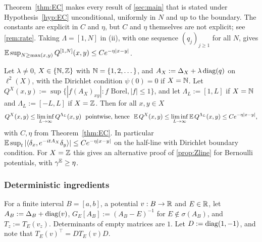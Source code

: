 Theorem~\ref{thm:EC} makes every result of \cref{sec:main} that is stated under
Hypothesis~\ref{hyp:EC} unconditional, uniformly in $N$ and up to the boundary.  The constants are
explicit in $C$ and $\eta$, but $C$ and $\eta$ themselves are not explicit; see \cref{rem:rate}.  Taking
$\Lambda=[1,N]$ in (ii), with one sequence $(q_j)_{j\ge1}$ for all $N$, gives
$\mathbb{E}\sup_{N\ge\max(x,y)}Q^{[1,N]}(x,y)\le Ce^{-\eta|x-y|}$.

\begin{corollary}\label{cor:ECinfvol}
Let $\lambda\neq0$, $X\in\{\mathbb{N},\mathbb{Z}\}$ with $\mathbb{N}=\{1,2,\dots\}$, and $A_X:=\Delta_X+\lambda\operatorname{diag}(q)$ on
$\ell^2(X)$, with the Dirichlet condition $\psi(0)=0$ if $X=\mathbb{N}$.  Let
$Q^X(x,y):=\sup\{|f(A_X)_{xy}|:f\text{ Borel},|f|\le1\}$, and let $\Lambda_L:=[1,L]$ if $X=\mathbb{N}$ and
$\Lambda_L:=[-L,L]$ if $X=\mathbb{Z}$.  Then for all $x,y\in X$
\begin{equation}\label{eq:ECinf}
  Q^X(x,y)\le\liminf_{L\to\infty}Q^{\Lambda_L}(x,y)\ \ \text{pointwise, hence}\ \
  \mathbb{E}\,Q^X(x,y)\le\liminf_{L\to\infty}\mathbb{E}\,Q^{\Lambda_L}(x,y)\le Ce^{-\eta|x-y|},
\end{equation}
with $C,\eta$ from Theorem~\ref{thm:EC}.  In particular
$\mathbb{E}\sup_t|\langle\delta_x,e^{-itA_X}\delta_y\rangle|\le Ce^{-\eta|x-y|}$ on the half-line with Dirichlet
boundary condition.  For $X=\mathbb{Z}$ this gives an alternative proof of \cref{prop:Zline} for Bernoulli
potentials, with $\gamma^{\mathbb{E}}\ge\eta$.
\end{corollary}

\subsubsection{Deterministic ingredients}

For a finite interval $B=[a,b]$, a potential $v:B\to\mathbb{R}$ and $E\in\mathbb{R}$, let $A_B:=\Delta_B+\operatorname{diag}(v)$,
$G_E[A_B]:=(A_B-E)^{-1}$ for $E\notin\sigma(A_B)$, and $T_z:=T_E(v_z)$.  Determinants of empty matrices
are $1$.  Let $D:=\operatorname{diag}(1,-1)$, and note that $T_E(v)^\top=DT_E(v)D$.

